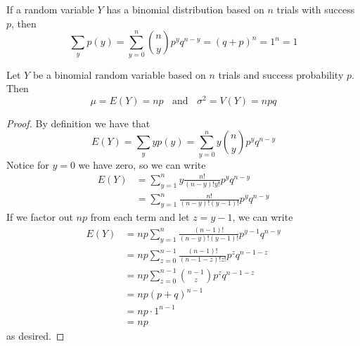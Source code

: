 \documentclass[12pt, a4paper, twoside, openright, titlepage]{book}
\begin{document}
\begin{cor}{}{}
    If a random variable $Y$ has a binomial distribution based on $n$ trials with success $p$, then \begin{equation*}
        \sum\limits_y p(y) = \sum\limits_{y=0}^n\binom{n}{y}p^yq^{n-y} = (q+p)^n = 1^n = 1
    \end{equation*}
\end{cor}


\begin{thm}{}{}
    Let $Y$ be a binomial random variable based on $n$ trials and success probability $p$. Then \begin{equation*}
        \mu = E(Y) = np\;\;\text{ and }\;\;\sigma^2 = V(Y) = npq
    \end{equation*}
\end{thm}
\begin{proof}{}{}
    By definition we have that \begin{equation*}
        E(Y) = \sum\limits_y yp(y) = \sum\limits_{y=0}^ny\binom{n}{y}p^yq^{n-y}
    \end{equation*}
    Notice for $y = 0$ we have zero, so we can write \begin{align*}
        E(Y) &= \sum\limits_{y=1}^ny\frac{n!}{(n-y)!y!}p^yq^{n-y} \\
        &= \sum\limits_{y=1}^n\frac{n!}{(n-y)!(y-1)!}p^yq^{n-y}
    \end{align*}
    If we factor out $np$ from each term and let $z = y-1$, we can write \begin{align*}
        E(Y) &= np\sum\limits_{y=1}^n\frac{(n-1)!}{(n-y)!(y-1)!}p^{y-1}q^{n-y} \\
        &= np\sum\limits_{z=0}^{n-1}\frac{(n-1)!}{(n-1-z)!z!}p^zq^{n-1-z} \\
        &= np\sum\limits_{z=0}^{n-1}\binom{n-1}{z}p^zq^{n-1-z} \\
        &= np(p+q)^{n-1} \\
        &= np\cdot 1^{n-1} \\
        &= np
    \end{align*}
    as desired.


\end{proof}
\end{document}
